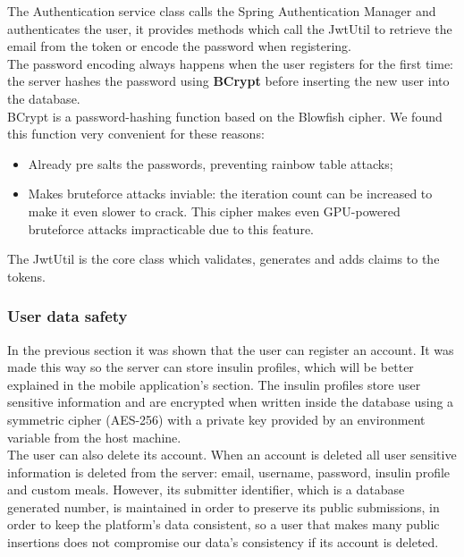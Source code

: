 The Authentication service class calls the Spring Authentication Manager and authenticates the user, it provides methods which call the JwtUtil
to retrieve the email from the token or encode the password when registering.\\

The password encoding always happens when the user registers for the first time: the server hashes the password using \textbf{BCrypt}\cite{bcrypt} before inserting the new
user into the database.\\

BCrypt is a password-hashing function based on the Blowfish\cite{blowfish} cipher. We found this function very convenient for these reasons:
\begin{itemize}
    \item Already pre salts the passwords, preventing rainbow table attacks\cite{rainbowtable};
    \item Makes bruteforce attacks inviable: the iteration count can be increased to make it even slower to crack.
    This cipher makes even GPU-powered bruteforce attacks impracticable due to this feature.
\end{itemize}

The JwtUtil is the core class which validates, generates and adds claims to the tokens.\\

\subsubsection{User data safety}

In the previous section it was shown that the user can register an account. It was made this way so the server can store
insulin profiles, which will be better explained in the mobile application's section. The insulin profiles store user sensitive
information and are encrypted when written inside the database using a symmetric cipher (AES-256) with a private key provided by an 
environment variable from the host machine.\\

The user can also delete its account. When an account is deleted all user sensitive information is deleted from the server: email,
username, password, insulin profile and custom meals. However, its submitter identifier, which is a database generated number,
is maintained in order to preserve its public submissions, in order to keep the platform's data consistent, so a user that makes many 
public insertions does not compromise our data's consistency if its account is deleted.\\

